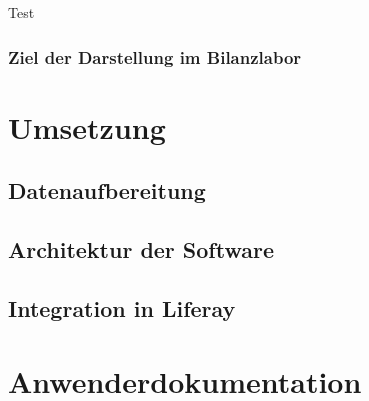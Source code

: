 Test
\subsection{Ziel der Darstellung im Bilanzlabor}

\chapter{Umsetzung}

\section{Datenaufbereitung}
\section{Architektur der Software}
\section{Integration in Liferay}

\chapter{Anwenderdokumentation}

